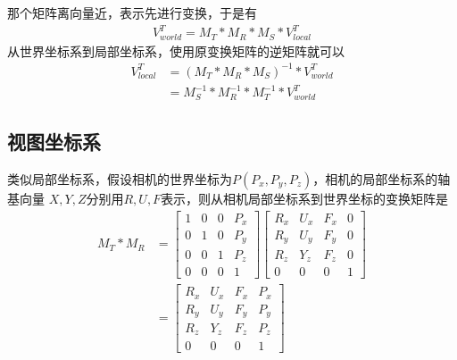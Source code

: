 那个矩阵离向量近，表示先进行变换，于是有
\begin{gather*}
    V_{world}^{T} = M_{T} \ast M_{R} \ast M_{S} \ast V_{local}^{T}
\end{gather*}
从世界坐标系到局部坐标系，使用原变换矩阵的逆矩阵就可以
\begin{equation*}
    \begin{split}
        V_{local}^{T} &= (M_{T} \ast M_{R} \ast M_{S})^{-1} \ast V_{world}^{T} \\
                      &= M_{S}^{-1} \ast M_{R}^{-1} \ast M_{T}^{-1} \ast V_{world}^{T}
    \end{split} 
\end{equation*}
    
\subsection{视图坐标系}
类似局部坐标系，假设相机的世界坐标为$P(P_{x}, P_{y}, P_{z})$，相机的局部坐标系的轴基向量
$X,Y,Z$分别用$R,U,F$表示，则从相机局部坐标系到世界坐标的变换矩阵是
\begin{equation*}
    \begin{split}
        M_{T} \ast M_{R} &= 
        \begin{bmatrix}
            1 & 0 & 0 & P_{x} \\ 
            0 & 1 & 0 & P_{y} \\
            0 & 0 & 1 & P_{z} \\
            0 & 0 & 0 & 1
        \end{bmatrix}
        \begin{bmatrix}
            R_{x} & U_{x} & F_{x} & 0 \\ 
            R_{y} & U_{y} & F_{y} & 0 \\
            R_{z} & Y_{z} & F_{z} & 0 \\
            0 & 0 & 0 & 1
        \end{bmatrix} \\
        &= \begin{bmatrix}
            R_{x} & U_{x} & F_{x} & P_{x} \\ 
            R_{y} & U_{y} & F_{y} & P_{y} \\
            R_{z} & Y_{z} & F_{z} & P_{z} \\
            0 & 0 & 0 & 1
        \end{bmatrix}
    \end{split} 
\end{equation*}

